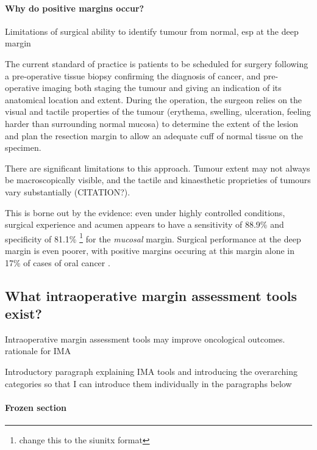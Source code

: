 \paragraph{Why do positive margins occur?}
Limitations of surgical ability to identify tumour from normal, esp at the deep margin


The current standard of practice is patients to be scheduled for surgery following a pre-operative tissue biopsy confirming the diagnosis of cancer, and pre-operative imaging both staging the tumour and giving an indication of its anatomical location and extent.
During the operation, the surgeon relies on the visual and tactile properties of the tumour (erythema, swelling, ulceration, feeling harder than surrounding normal mucosa) to determine the extent of the lesion and plan the resection margin to allow an adequate cuff of normal tissue on the specimen.

There are significant limitations to this approach. 
Tumour extent may not always be macroscopically visible, and the tactile and kinaesthetic proprieties of tumours vary substantially (CITATION?).

This is borne out by the evidence: even under highly controlled conditions, surgical experience and acumen appears to have a sensitivity of 88.9\% and specificity of 81.1\% \footnote{change this to the siunitx format} \cite{chaturvedip.GrossExaminationSurgeon2014} for the \emph{mucosal} margin.
Surgical performance at the deep margin is even poorer, with positive margins occuring at this margin alone in 17\% of cases of oral cancer \cite{woolgarHistopathologicalAppraisalSurgical2005}.

\subsection{What intraoperative margin assessment tools exist?}

Intraoperative margin assessment tools may improve oncological outcomes.
rationale for IMA

Introductory paragraph explaining IMA tools and introducing the overarching categories so that I can introduce them individually in the paragraphs below

\paragraph{Frozen section}


